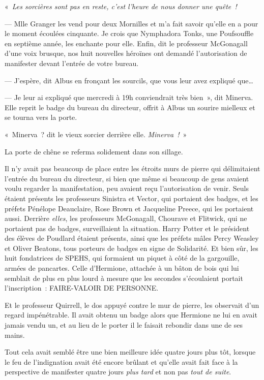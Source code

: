 «~\emph{Les sorcières sont pas en reste, c'est l'heure de nous donner une quête~!}

--- Mlle Granger les vend pour deux Mornilles et m'a fait savoir qu'elle en a pour le moment écoulées cinquante. Je crois que Nymphadora Tonks, une Poufsouffle en septième année, les enchante pour elle. Enfin, dit le professeur McGonagall d'une voix brusque, nos huit nouvelles héroïnes ont demandé l'autorisation de manifester devant l'entrée de votre bureau.

--- J'espère, dit Albus en fronçant les sourcils, que vous leur avez expliqué que…

--- Je leur ai expliqué que mercredi à 19h conviendrait très bien~», dit Minerva. Elle reprit le badge du bureau du directeur, offrit à Albus un sourire mielleux et se tourna vers la porte.

«~Minerva~? dit le vieux sorcier derrière elle. \emph{Minerva~!}~»

La porte de chêne se referma solidement dans son sillage.

\later

Il n'y avait pas beaucoup de place entre les étroits murs de pierre qui délimitaient l'entrée du bureau du directeur, si bien que même si beaucoup de gens avaient voulu regarder la manifestation, peu avaient reçu l'autorisation de venir. Seuls étaient présents les professeurs Sinistra et Vector, qui portaient des badges, et les préfets Pénélope Deauclaire, Rose Brown et Jacqueline Preece, qui les portaient aussi. Derrière \emph{elles}, les professeurs McGonagall, Chourave et Flitwick, qui ne portaient pas de badges, surveillaient la situation. Harry Potter et le président des élèves de Poudlard étaient présents, ainsi que les préfets mâles Percy Weasley et Oliver Beatons, tous porteurs de badges en signe de Solidarité. Et bien sûr, les huit fondatrices de SPEHS, qui formaient un piquet à côté de la gargouille, armées de pancartes. Celle d'Hermione, attachée à un bâton de bois qui lui semblait de plus en plus lourd à mesure que les secondes s'écoulaient portait l'inscription~: FAIRE-VALOIR DE PERSONNE.

Et le professeur Quirrell, le dos appuyé contre le mur de pierre, les observait d'un regard impénétrable. Il avait obtenu un badge alors que Hermione ne lui en avait jamais vendu un, et au lieu de le porter il le faisait rebondir dans une de ses mains.

Tout cela avait semblé être une bien meilleure idée quatre jours plus tôt, lorsque le feu de l'indignation avait été encore brûlant et qu'elle avait fait face à la perspective de manifester quatre jours \emph{plus tard} et non pas \emph{tout de suite}.

